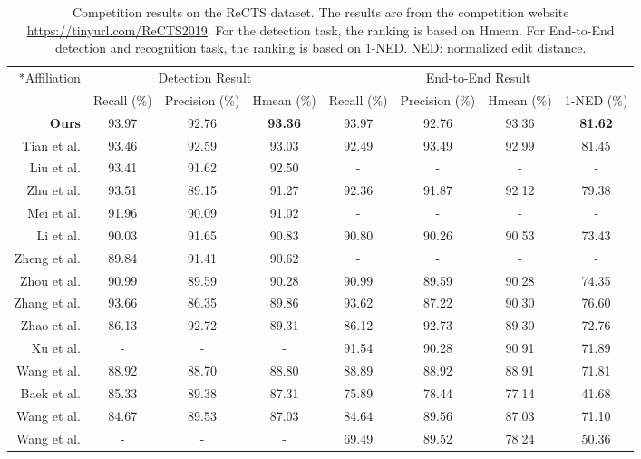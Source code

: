     \begin{table*}
      \centering
\small 
      \caption{Competition results on the ReCTS dataset. The results are from the competition website
      {\color{blue}
      \url{https://tinyurl.com/ReCTS2019}. 
      } For the detection task, the ranking is based on Hmean. For End-to-End detection and recognition task, the ranking is based on 1-NED. NED: normalized edit distance.}
      \label{tab:rects}       \begin{tabular}{ r |ccc|cccc}
        \hline\noalign{\smallskip}
        \multirow{2}*{Affiliation} & \multicolumn{3}{c|}{Detection Result} & \multicolumn{4}{c}{End-to-End Result} \\
        \cline{2-8}
              & Recall (\%) & Precision (\%) & Hmean (\%) & Recall (\%) & Precision (\%)& Hmean (\%) & 1-NED (\%) \\
\hline
        \bf Ours  & 93.97  & 92.76 & \bf 93.36 & 93.97  & 92.76 & 93.36  & \bf 81.62 \\
        \hline
        Tian et al. & 93.46  & 92.59& 93.03& 92.49 & 93.49 & 92.99  & 81.45 \\
        Liu et al.& 93.41  & 91.62  & 92.50& -  & - & -  & - \\
        Zhu et al.& 93.51  & 89.15 & 91.27& 92.36  & 91.87 &  92.12  & 79.38 \\
        Mei et al.& 91.96  & 90.09 & 91.02& -  & - & -  & - \\
        Li et al.& 90.03  & 91.65 & 90.83& 90.80  & 90.26 & 90.53  & 73.43 \\
        Zheng et al.& 89.84  & 91.41 & 90.62& -  & - & -  & - \\
        Zhou et al.& 90.99  & 89.59 & 90.28& 90.99  & 89.59 & 90.28 & 74.35 \\
        Zhang et al.& 93.66  & 86.35 & 89.86& 93.62  & 87.22 & 90.30  & 76.60 \\
        Zhao et al. & 86.13  & 92.72 & 89.31& 86.12  & 92.73 & 89.30  & 72.76 \\
        Xu et al. & -  & - & - & 91.54  & 90.28 & 90.91  & 71.89 \\
        Wang et al. & 88.92  & 88.70 & 88.80& 88.89  & 88.92 & 88.91  & 71.81 \\
        Baek et al. & 85.33  & 89.38 & 87.31& 75.89  & 78.44 & 77.14  & 41.68 \\
        Wang et al. & 84.67  & 89.53 & 87.03& 84.64  & 89.56 & 87.03  & 71.10 \\
        Wang et al. & -  & - & - & 69.49  & 89.52 & 78.24  & 50.36 \\

\end{tabular}
\end{table*}
